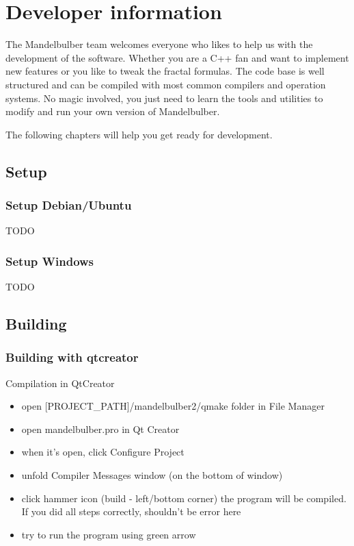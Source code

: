 \section{Developer information}\label{developers}

The Mandelbulber team welcomes everyone who likes to help us with the development of the software.
Whether you are a C++ fan and want to implement new features or you like to tweak the fractal formulas.
The code base is well structured and can be compiled with most common compilers and operation systems.
No magic involved, you just need to learn the tools and utilities to modify and run your own version of Mandelbulber.

The following chapters will help you get ready for development.

\subsection{Setup}\label{developers-setup}
\subsubsection{Setup Debian/Ubuntu}\label{developers-setup-debian-and-ubuntu}

TODO

\subsubsection{Setup Windows}\label{developers-setup-windows}

TODO

\subsection{Building}\label{developers-building}
\subsubsection{Building with qtcreator}\label{developers-building-qtcreator}

Compilation in QtCreator

\begin{itemize}
	\item open [PROJECT\_PATH]/mandelbulber2/qmake folder in File Manager
	\item open mandelbulber.pro in Qt Creator
	\item when it's open, click Configure Project
	\item unfold Compiler Messages window (on the bottom of window)
	\item click hammer icon (build - left/bottom corner)
	   the program will be compiled. If you did all steps correctly, shouldn't be error here
	\item try to run the program using green arrow
\end{itemize}

